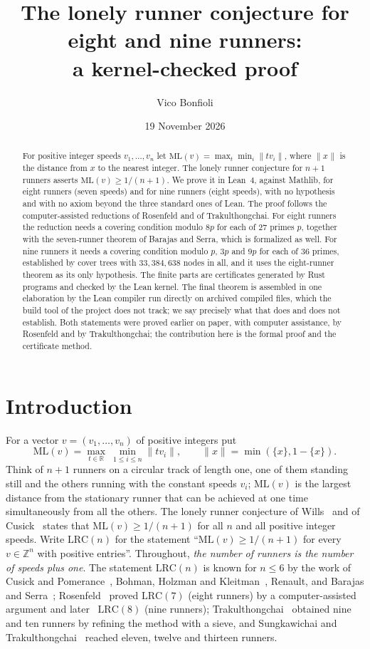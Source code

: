 \documentclass[11pt]{article}
\title{The lonely runner conjecture for eight and nine runners:\\ a kernel-checked proof}
\author{Vico Bonfioli}
\date{19 November 2026}
\theoremstyle{remark}
\newcommand{\ML}{\mathrm{ML}}
\newcommand{\R}{\mathbb{R}}
\newcommand{\Z}{\mathbb{Z}}
\newcommand{\dist}[1]{\lVert #1\rVert}
\begin{document}
\maketitle

\begin{abstract}
For positive integer speeds $v_1,\dots,v_n$ let $\ML(v)=\max_t\min_i\dist{tv_i}$, where $\dist{x}$ is the distance from $x$ to the nearest integer. The lonely runner conjecture for $n+1$ runners asserts $\ML(v)\ge1/(n+1)$. We prove it in Lean~4, against Mathlib, for eight runners (seven speeds) and for nine runners (eight speeds), with no hypothesis and with no axiom beyond the three standard ones of Lean. The proof follows the computer-assisted reductions of Rosenfeld and of Trakulthongchai. For eight runners the reduction needs a covering condition modulo $8p$ for each of $27$ primes $p$, together with the seven-runner theorem of Barajas and Serra, which is formalized as well. For nine runners it needs a covering condition modulo $p$, $3p$ and $9p$ for each of $36$ primes, established by cover trees with $33{,}384{,}638$ nodes in all, and it uses the eight-runner theorem as its only hypothesis. The finite parts are certificates generated by Rust programs and checked by the Lean kernel. The final theorem is assembled in one elaboration by the Lean compiler run directly on archived compiled files, which the build tool of the project does not track; we say precisely what that does and does not establish. Both statements were proved earlier on paper, with computer assistance, by Rosenfeld and by Trakulthongchai; the contribution here is the formal proof and the certificate method.
\end{abstract}

\section{Introduction}\label{sec:intro}

For a vector $v=(v_1,\dots,v_n)$ of positive integers put
\[
\ML(v)=\max_{t\in\R}\ \min_{1\le i\le n}\dist{tv_i},\qquad \dist{x}=\min(\{x\},1-\{x\}).
\]
Think of $n+1$ runners on a circular track of length one, one of them standing still and the others running with the constant speeds $v_i$; $\ML(v)$ is the largest distance from the stationary runner that can be achieved at one time simultaneously from all the others. The lonely runner conjecture of Wills~\cite{Wills} and of Cusick~\cite{Cusick} states that $\ML(v)\ge1/(n+1)$ for all $n$ and all positive integer speeds. Write $\mathrm{LRC}(n)$ for the statement ``$\ML(v)\ge 1/(n+1)$ for every $v\in\Z^n$ with positive entries''. Throughout, \emph{the number of runners is the number of speeds plus one}. The statement $\mathrm{LRC}(n)$ is known for $n\le 6$ by the work of Cusick and Pomerance~\cite{CP}, Bohman, Holzman and Kleitman~\cite{BHK}, Renault, and Barajas and Serra~\cite{BS}; Rosenfeld~\cite{Ros8} proved $\mathrm{LRC}(7)$ (eight runners) by a computer-assisted argument and later~\cite{Ros9} $\mathrm{LRC}(8)$ (nine runners); Trakulthongchai~\cite{Tra} obtained nine and ten runners by refining the method with a sieve, and Sungkawichai and Trakulthongchai~\cite{ST} reached eleven, twelve and thirteen runners.
\end{document}
